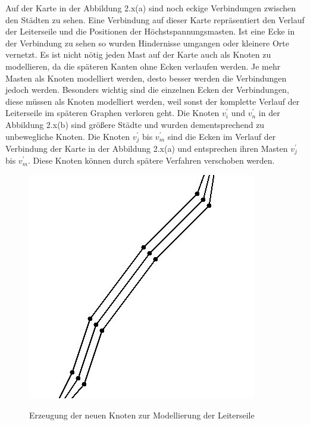 Auf der Karte in der Abbildung 2.x(a) sind noch eckige Verbindungen zwischen den Städten zu sehen. Eine Verbindung auf dieser Karte repräsentiert den Verlauf der Leiterseile und die Positionen der Höchstspannungsmasten. Ist eine Ecke in der Verbindung zu sehen so wurden Hindernisse umgangen oder kleinere Orte vernetzt. Es ist nicht nötig jeden Mast auf der Karte auch als Knoten zu modellieren, da die späteren Kanten ohne Ecken verlaufen werden. Je mehr Masten als Knoten modelliert werden, desto besser werden die Verbindungen jedoch werden. Besonders wichtig sind die einzelnen Ecken der Verbindungen, diese müssen als Knoten modelliert werden, weil sonst der komplette Verlauf der Leiterseile im späteren Graphen verloren geht. Die Knoten $v_{i}^{'}$ und $v_{n}^{'}$ in der Abbildung 2.x(b) sind größere Städte und wurden dementsprechend zu unbewegliche Knoten. Die Knoten $v_{j}^{'}$ bis $v_{m}^{'}$ sind die Ecken im Verlauf der Verbindung der Karte in der Abbildung 2.x(a) und entsprechen ihren Masten $v_{j}^{'}$ bis $v_{m}^{'}$. Diese Knoten können durch spätere Verfahren verschoben werden. \\
\begin{figure}[t]
	\centering
	{\includegraphics[scale=0.5]{bilder/knotenplacement}\label{fig_knotenplacement}
	}\\
	\caption[Erzeugung der neuen Knoten zur Modellierung der Leiterseile]{Erzeugung der neuen Knoten zur Modellierung der Leiterseile}
	\label{fig_knotenplacement}
\end{figure}

